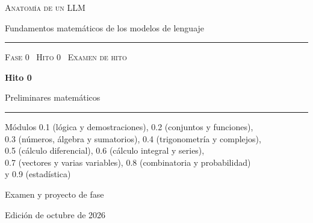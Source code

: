 \documentclass[11pt,a4paper,twoside,openany]{book}
\renewcommand{\thechapter}{\Alph{chapter}}
\begin{document}
\frontmatter
\begin{titlepage}
\centering
\vspace*{2.5cm}
{\large\scshape Anatomía de un LLM}\par
\vspace{0.4cm}
{\normalsize Fundamentos matemáticos de los modelos de lenguaje}\par
\vspace{2.2cm}
\rule{\textwidth}{0.8pt}\par\vspace{0.5cm}
{\small\scshape Fase 0 \textperiodcentered\ Hito 0 \textperiodcentered\ Examen de hito}\par\vspace{0.3cm}
{\Huge\bfseries Hito 0\par}\vspace{0.3cm}
{\LARGE Preliminares matemáticos\par}
\vspace{0.5cm}\rule{\textwidth}{0.4pt}\par
\vspace{1.0cm}
{\normalsize Módulos 0.1 (lógica y demostraciones), 0.2 (conjuntos y funciones),\\
0.3 (números, álgebra y sumatorios), 0.4 (trigonometría y complejos),\\
0.5 (cálculo diferencial), 0.6 (cálculo integral y series),\\
0.7 (vectores y varias variables), 0.8 (combinatoria y probabilidad)\\
y 0.9 (estadística)\par}
\vspace{1.4cm}
{\large Examen y proyecto de fase}\par
\vfill
{\small Edición de octubre de 2026}\par
\end{titlepage}



\tableofcontents

\mainmatter




\appendix
\renewcommand{\thechapter}{\Roman{chapter}}



\backmatter

\end{document}
